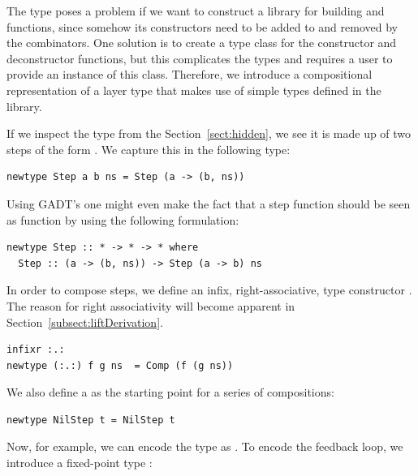 \documentclass[preprint,natbib]{sigplanconf}
\begin{document}
The  type poses a problem if we want to construct a library for building  and  functions, since somehow its constructors need to be added to and removed by the combinators. One solution is to create a type class for the constructor and deconstructor functions, but this complicates the types and requires a user to provide an instance of this class. Therefore, we introduce a compositional representation of a layer type that makes use of simple types defined in the library.

If we inspect the  type from the Section~\ref{sect:hidden}, we see it is made up of two steps of the form . We  capture this in the following type:

\begin{small}
\begin{verbatim}
newtype Step a b ns = Step (a -> (b, ns))
\end{verbatim}
\end{small}

\bc
Using GADT's one might even make the fact that a step function should be seen as function by using the following formulation:

\begin{small}
\begin{verbatim}
newtype Step :: * -> * -> * where
  Step :: (a -> (b, ns)) -> Step (a -> b) ns
\end{verbatim}
\end{small}
\ec

In order to compose steps, we define an infix, right-associative, type constructor .
The reason for right associativity will become apparent in Section~\ref{subsect:liftDerivation}.

\begin{small}
\begin{verbatim}
infixr :.:
newtype (:.:) f g ns  = Comp (f (g ns))
\end{verbatim}
\end{small}

We also define a  as the starting point for a series of compositions:

\begin{small}
\begin{verbatim}
newtype NilStep t = NilStep t
\end{verbatim}
\end{small}

Now, for example, we can encode the type  as
. To encode the feedback loop, we introduce a fixed-point type :
\end{document}
